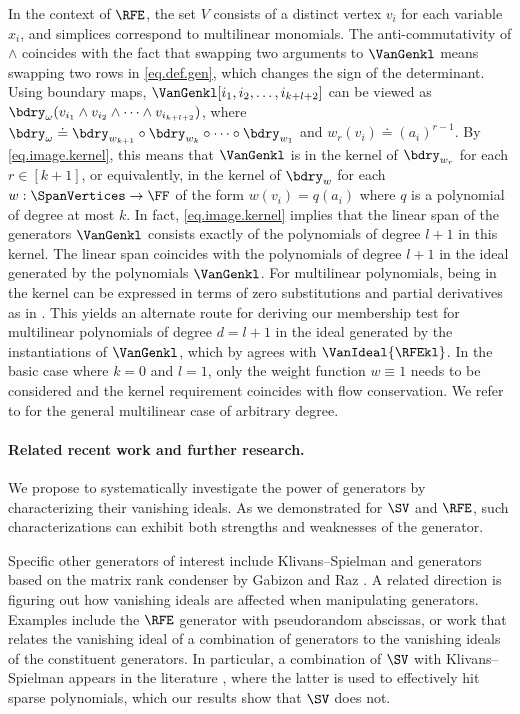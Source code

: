 \documentclass{toc}
\begin{document}
In the context of \(\RFE\),
the set $V$ consists of a distinct vertex $v_i$ for each variable $x_i$,
and simplices correspond to multilinear monomials.
The anti-commutativity of $\wedge$ coincides with the fact that swapping two
arguments to \(\VanGenkl\) means swapping two rows in \eqref{eq.def.gen},
which changes the sign of the determinant.
Using boundary maps, $\VanGenkl[i_1,i_2,\dots,i_{k+l+2}]$
can be viewed as
$\bdry_{\omega} (v_{i_1} \wedge v_{i_2} \wedge \dots \wedge v_{i_{k+l+2}})$, 
where
\(\bdry_{\omega} \doteq \bdry_{w_{k+1}} \circ \bdry_{w_k} \circ \dots \circ
\bdry_{w_1}\) and
$w_r(v_i) \doteq (a_i)^{r-1}$.
By \eqref{eq.image.kernel},
this means that $\VanGenkl$ is in the kernel of $\bdry_{w_r}$ for each
$r \in [k+1]$,
or equivalently,
in the kernel of $\bdry_w$ for each $w: \SpanVertices \to \FF$
of the form $w(v_i)=q(a_i)$
where $q$ is a polynomial of degree at most $k$.
In fact,
\eqref{eq.image.kernel} implies that the linear span of the generators
$\VanGenkl$ consists exactly of the polynomials of degree $l+1$ in this
kernel. The linear span coincides with the polynomials of degree $l+1$ in the ideal generated by the polynomials $\VanGenkl$. For multilinear polynomials, being in the kernel can be expressed in terms of zero substitutions and partial derivatives as in . This yields an alternate route for deriving our membership test for multilinear polynomials of degree $d=l+1$ in the ideal generated by the instantiations of $\VanGenkl$, which by  agrees with $\VanIdeal{\RFEkl}$. In the basic case where $k=0$ and $l=1$, only the weight function $w \equiv 1$ needs to be considered and the kernel requirement coincides with flow conservation. We refer to  for the general multilinear case of arbitrary degree. 

\paragraph{Related recent work and further research.}
We propose to systematically investigate the power of generators by characterizing their vanishing ideals. As we demonstrated for $\SV$ and $\RFE$, such characterizations can exhibit both strengths and weaknesses of the generator. 

Specific other generators of interest include Klivans--Spielman \cite{KS2001} and generators based on the matrix rank condenser by Gabizon and Raz \cite{GR2008,KS2011,FS2012}.  A related direction is figuring out how vanishing ideals are affected when manipulating generators. Examples include the $\RFE$ generator with pseudorandom abscissas, or work that relates the vanishing ideal of a combination of generators to the vanishing ideals of the constituent generators. In particular, a combination of $\SV$ with Klivans--Spielman appears in the literature \cite{KMSV2009, FSS2014, FSV2018}, where the latter is used to effectively hit sparse polynomials, which our results show that $\SV$ does not.
\end{document}
